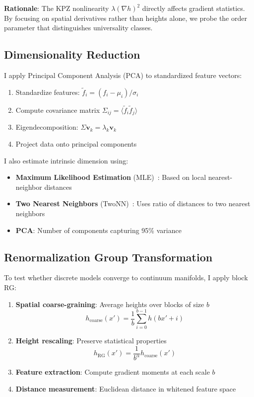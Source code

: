\documentclass[aps,pre,twocolumn,superscriptaddress,showpacs]{revtex4-2}
\begin{document}
\textbf{Rationale}: The KPZ nonlinearity $\lambda(\nabla h)^2$ directly affects gradient statistics. By focusing on spatial derivatives rather than heights alone, we probe the order parameter that distinguishes universality classes.

\subsection{Dimensionality Reduction}

I apply Principal Component Analysis (PCA) to standardized feature vectors:
\begin{enumerate}
\item Standardize features: $\tilde{f}_i = (f_i - \mu_i) / \sigma_i$
\item Compute covariance matrix $\Sigma_{ij} = \langle \tilde{f}_i \tilde{f}_j \rangle$
\item Eigendecomposition: $\Sigma \mathbf{v}_k = \lambda_k \mathbf{v}_k$
\item Project data onto principal components
\end{enumerate}

I also estimate intrinsic dimension using:
\begin{itemize}
\item \textbf{Maximum Likelihood Estimation} (MLE)~\cite{Levina2004}: Based on local nearest-neighbor distances
\item \textbf{Two Nearest Neighbors} (TwoNN)~\cite{Facco2017}: Uses ratio of distances to two nearest neighbors
\item \textbf{PCA}: Number of components capturing 95\% variance
\end{itemize}

\subsection{Renormalization Group Transformation}

To test whether discrete models converge to continuum manifolds, I apply block RG:
\begin{enumerate}
\item \textbf{Spatial coarse-graining}: Average heights over blocks of size $b$
\begin{equation}
h_{\text{coarse}}(x') = \frac{1}{b} \sum_{i=0}^{b-1} h(bx' + i)
\end{equation}
\item \textbf{Height rescaling}: Preserve statistical properties
\begin{equation}
h_{\text{RG}}(x') = \frac{1}{b^\alpha} h_{\text{coarse}}(x')
\end{equation}
\item \textbf{Feature extraction}: Compute gradient moments at each scale $b$
\item \textbf{Distance measurement}: Euclidean distance in whitened feature space
\end{enumerate}
\end{document}
